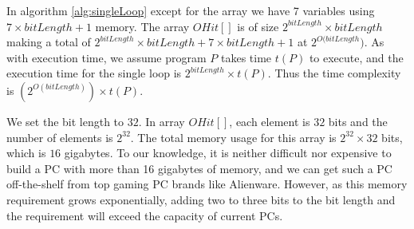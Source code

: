 In algorithm \ref{alg:singleLoop} except for the array we have 7 variables using $7 \times bitLength + 1$ memory. The array $OHit[]$ is of size $2^{bitLength} \times bitLength$ making a total of $2^{bitLength} \times bitLength + 7 \times bitLength + 1$ at $2^{O(bitLength})$. As with execution time, we assume program $P$ takes time $t(P)$ to execute, and the execution time for the single loop is $2^{bitLength} \times t(P)$. Thus the time complexity is $(2^{O(bitLength)}) \times t(P)$.

We set the bit length to $32$. In array $OHit[]$, each element is $32$ bits and the number of elements is $2^{32}$. The total memory usage for this array is $2^{32} \times 32$ bits, which is $16$ gigabytes. To our knowledge, it is neither difficult nor expensive to build a PC with more than 16 gigabytes of memory, and we can get such a PC off-the-shelf from top gaming PC brands like Alienware. However, as this memory requirement grows exponentially, adding two to three bits to the bit length and the requirement will exceed the capacity of current PCs.